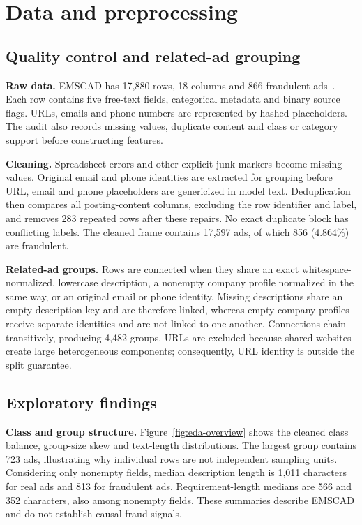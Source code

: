 \section{Data and preprocessing}
\label{data}

\subsection{Quality control and related-ad grouping}

\textbf{Raw data.} EMSCAD has 17,880 rows, 18 columns and 866 fraudulent ads~\cite{vidros2017}. Each row contains five
free-text fields, categorical metadata and binary source flags. URLs, emails and phone numbers are
represented by hashed placeholders. The audit also records missing values, duplicate content and
class or category support before constructing features.

\textbf{Cleaning.} Spreadsheet errors and other explicit junk markers become missing values.
Original email and phone identities are extracted for grouping before URL, email and phone
placeholders are genericized in model text. Deduplication then compares all posting-content columns,
excluding the row identifier and label, and removes 283 repeated rows after these repairs. No exact
duplicate block has conflicting labels. The cleaned frame contains 17,597 ads, of which 856
(4.864\%) are fraudulent.

\textbf{Related-ad groups.} Rows are connected when they share an exact whitespace-normalized,
lowercase description, a nonempty company profile normalized in the same way, or an original email
or phone identity. Missing descriptions share an empty-description key and are therefore linked,
whereas empty company profiles receive separate identities and are not linked to one another.
Connections chain transitively, producing 4,482 groups. URLs are excluded because shared websites
create large heterogeneous components; consequently, URL identity is outside the split guarantee.

\subsection{Exploratory findings}

\textbf{Class and group structure.} Figure~\ref{fig:eda-overview} shows the cleaned class balance,
group-size skew and text-length distributions. The largest group contains 723 ads, illustrating why
individual rows are not independent sampling units. Considering only nonempty fields, median
description length is 1,011 characters for real ads and 813 for fraudulent ads. Requirement-length
medians are 566 and 352 characters, also among nonempty fields. These summaries describe EMSCAD and
do not establish causal fraud signals.

